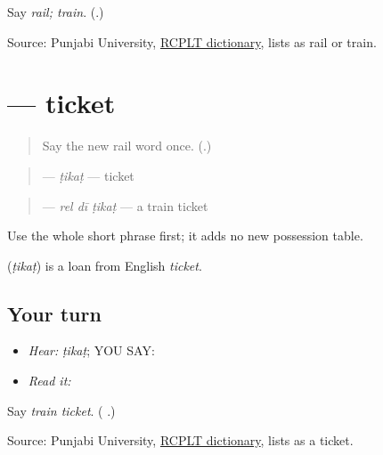 \begin{tcolorbox}[breakable,colback=teal!4,colframe=teal!35!black,title={Before you move on}]
Say \emph{rail; train}. (\textbf{}.)

Source: Punjabi University, \href{https://dic.learnpunjabi.org/default.aspx?look=\%E0\%A8\%B0\%E0\%A9\%87\%E0\%A8\%B2}{RCPLT dictionary}, lists \textbf{} as rail or train.
\end{tcolorbox}
\section[\texorpdfstring{\pa{ਟਿਕਟ} (tikat)}{ਟਿਕਟ (tikat)}]{ — ticket}

\label{lesson:PA-C181-ticket}



\begin{quote}
Say the new rail word once. (\textbf{}.)
\end{quote}

\begin{grammarlens}[title={Grammar Lens: one travel item}]
\begin{quote}
\textbf{} — \emph{ṭikaṭ} — ticket
\end{quote}

\begin{quote}
\textbf{  } — \emph{rel dī ṭikaṭ} — a train ticket
\end{quote}

Use the whole short phrase first; it adds no new possession table.
\end{grammarlens}

\begin{cousinweb}
\textbf{} (\emph{ṭikaṭ}) is a loan from English \emph{ticket}.
\end{cousinweb}

\subsection*{Your turn}
\begin{itemize}
\raggedright
  \item \emph{Hear:} \emph{ṭikaṭ}; YOU SAY: \textbf{}
  \item \emph{Read it:} \textbf{  }
\end{itemize}

\begin{tcolorbox}[breakable,colback=teal!4,colframe=teal!35!black,title={Before you move on}]
Say \emph{train ticket}. (\textbf{  }.)

Source: Punjabi University, \href{https://dic.learnpunjabi.org/default.aspx?look=\%E0\%A8\%9F\%E0\%A8\%BF\%E0\%A8\%95\%E0\%A8\%9F}{RCPLT dictionary}, lists \textbf{} as a ticket.
\end{tcolorbox}
